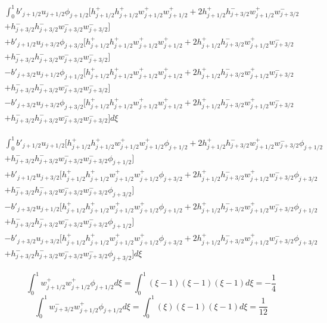 \documentclass[12pt]{article}
\begin{document}
\begin{multline} 
\int_{0}^{1}b'_{j+1/2}u_{j+1/2} \phi_{j+1/2} \bigg[h^+_{j+1/2}h^+_{j+1/2} w^+_{j+1/2}w^+_{j+1/2}+ 2h^+_{j+1/2}h^-_{j+3/2} w^+_{j+1/2} w^-_{j+3/2} \\+ h^-_{j+3/2}h^-_{j+3/2} w^-_{j+3/2}w^-_{j+3/2}\bigg]\\ + b'_{j+1/2}u_{j+3/2} \phi_{j+3/2}\bigg[h^+_{j+1/2}h^+_{j+1/2} w^+_{j+1/2}w^+_{j+1/2}+ 2h^+_{j+1/2}h^-_{j+3/2} w^+_{j+1/2} w^-_{j+3/2} \\+ h^-_{j+3/2}h^-_{j+3/2} w^-_{j+3/2}w^-_{j+3/2}\bigg] \\
-  b'_{j+3/2} u_{j+1/2}\phi_{j+1/2}\bigg[h^+_{j+1/2}h^+_{j+1/2} w^+_{j+1/2}w^+_{j+1/2}+ 2h^+_{j+1/2}h^-_{j+3/2} w^+_{j+1/2} w^-_{j+3/2} \\+ h^-_{j+3/2}h^-_{j+3/2} w^-_{j+3/2}w^-_{j+3/2}\bigg] \\
-  b'_{j+3/2}u_{j+3/2}\phi_{j+3/2} \bigg[h^+_{j+1/2}h^+_{j+1/2} w^+_{j+1/2}w^+_{j+1/2}+ 2h^+_{j+1/2}h^-_{j+3/2} w^+_{j+1/2} w^-_{j+3/2} \\+ h^-_{j+3/2}h^-_{j+3/2} w^-_{j+3/2}w^-_{j+3/2}\bigg]    d\xi
\end{multline}

\begin{multline} 
\int_{0}^{1}b'_{j+1/2}u_{j+1/2} \bigg[h^+_{j+1/2}h^+_{j+1/2} w^+_{j+1/2}w^+_{j+1/2} \phi_{j+1/2} + 2h^+_{j+1/2}h^-_{j+3/2} w^+_{j+1/2} w^-_{j+3/2} \phi_{j+1/2}  \\+ h^-_{j+3/2}h^-_{j+3/2} w^-_{j+3/2}w^-_{j+3/2} \phi_{j+1/2} \bigg]\\ + b'_{j+1/2}u_{j+3/2}\bigg[h^+_{j+1/2}h^+_{j+1/2} w^+_{j+1/2}w^+_{j+1/2}\phi_{j+3/2}+ 2h^+_{j+1/2}h^-_{j+3/2} w^+_{j+1/2} w^-_{j+3/2}\phi_{j+3/2} \\+ h^-_{j+3/2}h^-_{j+3/2} w^-_{j+3/2}w^-_{j+3/2}\phi_{j+3/2}\bigg] \\
-  b'_{j+3/2} u_{j+1/2}\bigg[h^+_{j+1/2}h^+_{j+1/2} w^+_{j+1/2}w^+_{j+1/2}\phi_{j+1/2}+ 2h^+_{j+1/2}h^-_{j+3/2} w^+_{j+1/2} w^-_{j+3/2}\phi_{j+1/2} \\+ h^-_{j+3/2}h^-_{j+3/2} w^-_{j+3/2}w^-_{j+3/2}\phi_{j+1/2}\bigg] \\
-  b'_{j+3/2}u_{j+3/2} \bigg[h^+_{j+1/2}h^+_{j+1/2} w^+_{j+1/2}w^+_{j+1/2}\phi_{j+3/2}+ 2h^+_{j+1/2}h^-_{j+3/2} w^+_{j+1/2} w^-_{j+3/2}\phi_{j+3/2} \\+ h^-_{j+3/2}h^-_{j+3/2} w^-_{j+3/2}w^-_{j+3/2}\phi_{j+3/2}\bigg]    d\xi
\end{multline}


\[\int_{0}^{1} w^+_{j+1/2}w^+_{j+1/2} \phi_{j+1/2} d\xi =\int_{0}^{1} (\xi -1)(\xi -1)(\xi - 1 ) d\xi =  - \frac{1}{4}\]
\[\int_{0}^{1} w^-_{j+3/2}w^+_{j+1/2} \phi_{j+1/2} d\xi =\int_{0}^{1} (\xi)(\xi -1)(\xi - 1 ) d\xi = \frac{1}{12}\]
\end{document}
